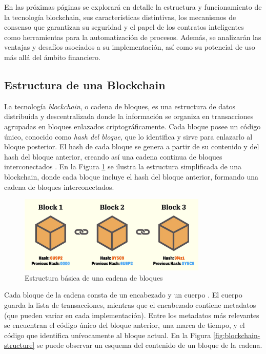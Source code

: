 En las próximas páginas se explorará en detalle la estructura y funcionamiento de la tecnología blockchain, sus características distintivas, los mecanismos de consenso que garantizan su seguridad y el papel de los contratos inteligentes como herramientas para la automatización de procesos. Además, se analizarán las ventajas y desafíos asociados a su implementación, así como su potencial de uso más allá del ámbito financiero.

\subsection{Estructura de una Blockchain}

La tecnología \textit{blockchain}, o cadena de bloques, es una estructura de datos distribuida y descentralizada donde la información se organiza en transacciones agrupadas en bloques enlazados criptográficamente. Cada bloque posee un código único, conocido como \textit{hash del bloque}, que lo identifica y sirve para enlazarlo al bloque posterior. El hash de cada bloque se genera a partir de su contenido y del hash del bloque anterior, creando así una cadena continua de bloques interconectados \cite{tripathi2023comprehensive}. En la Figura \ref{fig:blockchain-basic} se ilustra la estructura simplificada de una blockchain, donde cada bloque incluye el hash del bloque anterior, formando una cadena de bloques interconectados.

\begin{figure}[!htpb]
    \centering
    \includegraphics[width=0.8\textwidth]{Figures/blockchain-basic.jpg}
    \caption{Estructura básica de una cadena de bloques}
    \label{fig:blockchain-basic}
\end{figure}

Cada bloque de la cadena consta de un encabezado y un cuerpo \cite{tripathi2023comprehensive}. El cuerpo guarda la lista de transacciones, mientras que el encabezado contiene metadatos (que pueden variar en cada implementación). Entre los metadatos más relevantes se encuentran el código único del bloque anterior, una marca de tiempo, y el código que identifica unívocamente al bloque actual. En la Figura \ref{fig:blockchain-structure} se puede observar un esquema del contenido de un bloque de la cadena.

